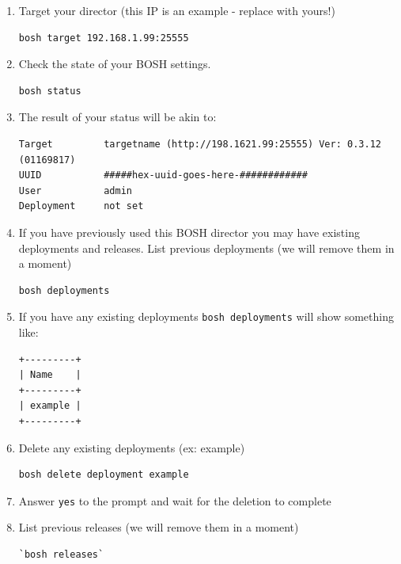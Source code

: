 \begin{enumerate}
\item Target your director (this IP is an example - replace with yours!) 

\begin{verbatim}
bosh target 192.168.1.99:25555 
\end{verbatim}


\item Check the state of your BOSH settings.

\begin{verbatim}
bosh status
\end{verbatim}


\item The result of your status will be akin to:

\begin{verbatim}
Target         targetname (http://198.1621.99:25555) Ver: 0.3.12 (01169817)
UUID           #####hex-uuid-goes-here-############
User           admin
Deployment     not set
\end{verbatim}


\item If you have previously used this BOSH director you may have existing deployments and releases. List previous deployments (we will remove them in a moment)

\begin{verbatim}
bosh deployments
\end{verbatim}


\item If you have any existing deployments \texttt{bosh deployments} will show something like:

\begin{verbatim}
+---------+
| Name    |
+---------+
| example |
+---------+
\end{verbatim}


\item Delete any existing deployments (ex: example) 

\begin{verbatim}
bosh delete deployment example 
\end{verbatim}


\item Answer \texttt{yes} to the prompt and wait for the deletion to complete

\item List previous releases (we will remove them in a moment)

\begin{verbatim}
`bosh releases`
\end{verbatim}



\end{enumerate}
